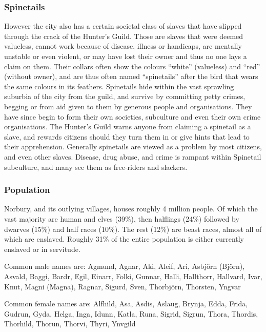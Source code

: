 \subsubsection{Spinetails}
\label{sec:Spinetails}

However the city also has a certain societal class of slaves that have slipped
through the crack of the Hunter's Guild. Those are slaves that were deemed
valueless, cannot work because of disease, illness or handicaps, are mentally
unstable or even violent, or may have lost their owner and thus no one lays a
claim on them. Their collars often show the colours ``white'' (valueless) and
``red'' (without owner), and are thus often named ``spinetails'' after the
bird that wears the same colours in its feathers. Spinetails hide within the
vast sprawling suburbia of the city from the guild, and survive by committing
petty crimes, begging or from aid given to them by generous people and
organisations. They have since begin to form their own societies, subculture
and even their own crime organisations. The Hunter's Guild warns anyone from
claiming a spinetail as a slave, and rewards citizens should they turn them in
or give hints that lead to their apprehension. Generally spinetails are viewed
as a problem by most citizens, and even other slaves. Disease, drug abuse, and
crime is rampant within Spinetail subculture, and many see them as free-riders
and slackers.

\subsubsection{Population}

Norbury, and its outlying villages, houses roughly 4 million people. Of which
the vast majority are human and elves (39\%), then halflings (24\%) followed
by dwarves (15\%) and half races (10\%). The rest (12\%) are beast races,
almost all of which are enslaved. Roughly 31\% of the entire population is
either currently enslaved or in servitude.

Common male names are: Agmund, Agnar, Aki, Aleif, Ari, Asbjörn (Björn),
Asvald, Baggi, Bardr, Egil, Einarr, Folki, Gunnar, Halli, Hallthorr, Hallvard,
Ivar, Knut, Magni (Magna), Ragnar, Sigurd, Sven, Thorbjörn, Thorsten, Yngvar

Common female names are: Alfhild, Asa, Asdis, Aslaug, Brynja, Edda, Frida,
Gudrun, Gyda, Helga, Inga, Idunn, Katla, Runa, Sigrid, Sigrun, Thora,
Thordis, Thorhild, Thorun, Thorvi, Thyri, Ynvgild
